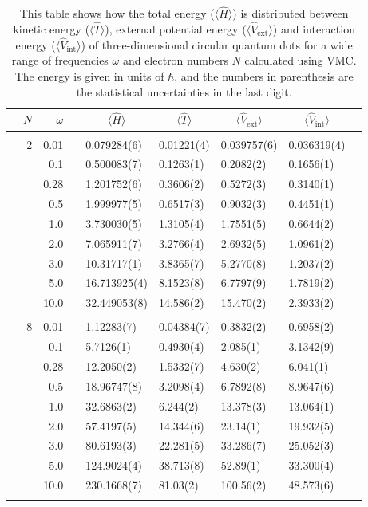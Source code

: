 \begin{table}[H]
	\caption{This table shows how the total energy ($\langle\hat{H}\rangle$) is distributed between kinetic energy ($\langle\hat{T}\rangle$), external potential energy ($\langle\hat{V}_{\text{ext}}\rangle$) and interaction energy ($\langle\hat{V}_{\text{int}}\rangle$) of three-dimensional circular quantum dots for a wide range of frequencies $\omega$ and electron numbers $N$ calculated using VMC. The energy is given in units of $\hbar$, and the numbers in parenthesis are the statistical uncertainties in the last digit.}
	\label{tab:splitfrequencyQDVMC3D}
	\begin{tabularx}{\textwidth}{R{1cm}rrcR{2.3cm}R{2.3cm}R{2.3cm}R{2.3cm}R{1cm}} \hline\hline
		\makecell{\\ \phantom{$N$}} & $N$ & $\omega$ &&  &  &  &  & \\ \hline \\
		&2 & 0.01 && 0.079284(6) & 0.01221(4) & 0.039757(6) & 0.036319(4) \\
		&& 0.1 && 0.500083(7) & 0.1263(1) & 0.2082(2) & 0.1656(1) \\
		&& 0.28 && 1.201752(6) & 0.3606(2) & 0.5272(3) & 0.3140(1) \\
		&& 0.5 && 1.999977(5) & 0.6517(3) & 0.9032(3) & 0.4451(1) \\
		&& 1.0 && 3.730030(5) & 1.3105(4) & 1.7551(5) & 0.6644(2) \\
		&& 2.0 && 7.065911(7) & 3.2766(4) & 2.6932(5) & 1.0961(2) \\
		&& 3.0 && 10.31717(1) & 3.8365(7) & 5.2770(8) & 1.2037(2) \\ 
		&& 5.0 && 16.713925(4) & 8.1523(8) & 6.7797(9) & 1.7819(2) \\
		&& 10.0 && 32.449053(8) & 14.586(2) & 15.470(2) & 2.3933(2) \\
		\hdashline \\
		
		&8 & 0.01 && 1.12283(7) & 0.04384(7) & 0.3832(2) & 0.6958(2) \\
		&& 0.1 && 5.7126(1) & 0.4930(4) & 2.085(1) & 3.1342(9) \\
		&& 0.28 && 12.2050(2) & 1.5332(7) & 4.630(2) & 6.041(1) \\
		&& 0.5 && 18.96747(8) & 3.2098(4) & 6.7892(8) & 8.9647(6) \\
		&& 1.0 && 32.6863(2) & 6.244(2) & 13.378(3) & 13.064(1) \\
		&& 2.0 && 57.4197(5) & 14.344(6) & 23.14(1) & 19.932(5) \\
		&& 3.0 && 80.6193(3) & 22.281(5) & 33.286(7) & 25.052(3) \\ 
		&& 5.0 && 124.9024(4) & 38.713(8) & 52.89(1) & 33.300(4) \\
		&& 10.0 && 230.1668(7) & 81.03(2) & 100.56(2) & 48.573(6) \\
		\hdashline \\
		

\end{tabularx}
\end{table}
